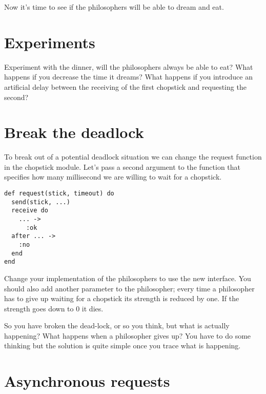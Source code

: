 \documentclass[a4paper,11pt]{article}
\begin{document}
Now it's time to see if the philosophers will be able to dream and eat. 



\section{Experiments}

Experiment with the dinner, will the philosophers always be able to
eat? What happens if you decrease the time it dreams? What happens if
you introduce an artificial delay between the receiving of the first
chopstick and requesting the second?



\section{Break the deadlock}

To break out of a potential deadlock situation we can change the
request function in the chopstick module. Let's pass a second argument
to the function that specifies how many millisecond we are willing to
wait for a chopstick.

\pagebreak

\begin{verbatim}
def request(stick, timeout) do
  send(stick, ...)
  receive do
    ... -> 
      :ok
  after ... -> 
    :no
  end
end
\end{verbatim}

Change your implementation of the philosophers to use the new
interface. You should also add another parameter to the philosopher;
every time a philosopher has to give up waiting for a chopstick its
strength is reduced by one. If the strength goes down to $0$ it dies. 

So you have broken the dead-lock, or so you think, but what is
actually happening? What happens when a philosopher gives up? You have
to do some thinking but the solution is quite simple once you trace
what is happening.



\section{Asynchronous requests}
\end{document}
